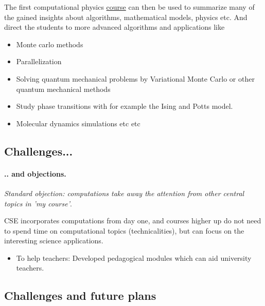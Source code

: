 \documentclass[%
twoside,                 %
final,                   %
10pt]{article}
\begin{document}
The first computational physics \href{{http://www.uio.no/studier/emner/matnat/fys/FYS3150/h14/}}{course} can then be used to summarize many of the gained insights about algorithms, mathematical models, physics etc. And direct the students to more advanced algorithms and applications like

\begin{itemize}
\item Monte carlo methods

\item Parallelization

\item Solving quantum mechanical problems by Variational Monte Carlo  or other quantum mechanical methods

\item Study phase transitions with for example the Ising and Potts model.

\item Molecular dynamics simulations etc etc 
\end{itemize}

\noindent




\subsection{Challenges...}

\paragraph{.. and objections.}

\emph{Standard objection: computations take away the attention from other central topics in 'my course'}. 

CSE incorporates computations from day one, and courses higher up do not need to
spend time on computational topics  (technicalities), but can focus on the interesting
science applications.

\begin{itemize}
\item To help teachers: Developed pedagogical modules which can aid university teachers.
\end{itemize}

\noindent



\subsection{Challenges and future plans}
\end{document}
